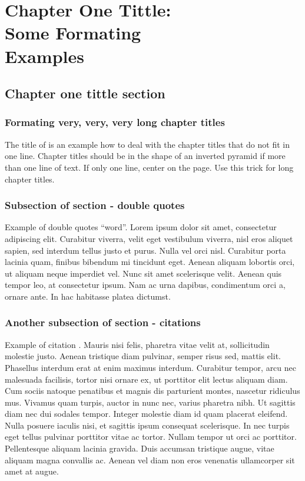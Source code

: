 \chapterfont{\centering}
\chapter[Chapter One Tittle: Some Formating Examples]{Chapter One Tittle:\\ Some Formating\\ Examples}\label{ch_one}
\section{Chapter one tittle section}
\subsection{Formating very, very, very long chapter titles}
The title of  is an example how to deal with the chapter titles that do not fit in one line. Chapter titles should be in the shape of an inverted pyramid if more than one line of text. If only one line, center on the page. Use this trick for long chapter titles.

\subsection{Subsection of section - double quotes}
Example of double quotes ``word''. Lorem ipsum dolor sit amet, consectetur adipiscing elit. Curabitur viverra, velit eget vestibulum viverra, nisl eros aliquet sapien, sed interdum tellus justo et purus. Nulla vel orci nisl. Curabitur porta lacinia quam, finibus bibendum mi tincidunt eget. Aenean aliquam lobortis orci, ut aliquam neque imperdiet vel. Nunc sit amet scelerisque velit. Aenean quis tempor leo, at consectetur ipsum. Nam ac urna dapibus, condimentum orci a, ornare ante. In hac habitasse platea dictumst. 
\subsection{Another subsection of section - citations}
Example of citation \citep{altschul1997gapped}. Mauris nisi felis, pharetra vitae velit at, sollicitudin molestie justo. Aenean tristique diam pulvinar, semper risus sed, mattis elit. Phasellus interdum erat at enim maximus interdum. Curabitur tempor, arcu nec malesuada facilisis, tortor nisi ornare ex, ut porttitor elit lectus aliquam diam. Cum sociis natoque penatibus et magnis dis parturient montes, nascetur ridiculus mus. Vivamus quam turpis, auctor in nunc nec, varius pharetra nibh. Ut sagittis diam nec dui sodales tempor. Integer molestie diam id quam placerat eleifend. Nulla posuere iaculis nisi, et sagittis ipsum consequat scelerisque. In nec turpis eget tellus pulvinar porttitor vitae ac tortor. Nullam tempor ut orci ac porttitor. Pellentesque aliquam lacinia gravida. Duis accumsan tristique augue, vitae aliquam magna convallis ac. Aenean vel diam non eros venenatis ullamcorper sit amet at augue. 

